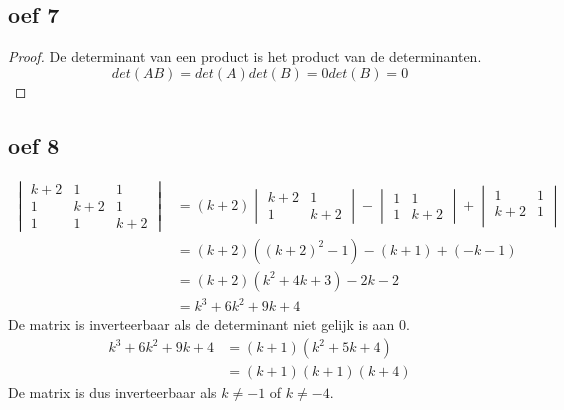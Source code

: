 \documentclass[10pt,a4paper]{article}
\begin{document}
\subsection*{oef 7}
\begin{proof}
De determinant van een product is het product van de determinanten.
\[
det(AB) = det(A) det(B) = 0 det(B) = 0 
\]
\end{proof}

\subsection*{oef 8}
\begin{align*}
    \begin{vmatrix}
        k+2 & 1 & 1\\
        1 & k+2 & 1\\
        1 & 1 & k+2
    \end{vmatrix}
    &= (k+2) 
    \begin{vmatrix}
        k+2 & 1\\
        1 & k+2    
    \end{vmatrix} - 
    \begin{vmatrix}
        1 & 1\\
        1 & k+2
    \end{vmatrix} + 
    \begin{vmatrix}
        1 & 1\\
        k+2 & 1\\
    \end{vmatrix}\\
    &= (k+2)((k+2)^2 - 1) - (k+1) + (-k-1)\\
    &= (k+2)(k^2 + 4k + 3) -2k - 2\\
    &= k^3 + 6k^2 + 9k + 4
\end{align*}
De matrix is inverteerbaar als de determinant niet gelijk is aan 0.
\begin{align*}
    k^3 + 6k^2 + 9k + 4 &= (k+1)(k^2 + 5k + 4)\\
    &= (k+1)(k+1)(k+4)
\end{align*}
De matrix is dus inverteerbaar als $k \neq -1$ of $k \neq -4$.
\end{document}
